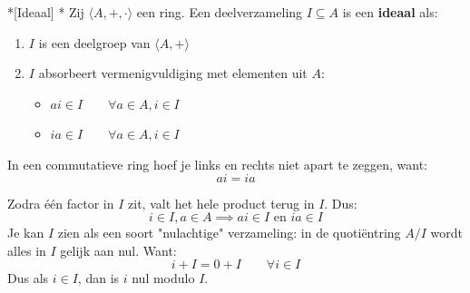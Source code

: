 
\begin{nicedefinition}*[Ideaal]
    \nextpart[]*
    Zij $\langle A, +, \cdot \rangle$ een ring. Een deelverzameling $I \subseteq A$ is een \textcolor{PineGreen!75!black}{\textbf{ideaal}} als:
    \begin{enumerate}
        \item $I$ is een deelgroep van $\langle A, + \rangle$
        \item $I$ absorbeert vermenigvuldiging met elementen uit $A$:
        \begin{itemize}
            \item[] $ai \in I \qquad \forall a \in A, i \in I$
            \item[] $ia \in I \qquad \forall a \in A, i \in I$
        \end{itemize}
    \end{enumerate}
\end{nicedefinition}

\textbf{} In een commutatieve ring hoef je links en rechts niet apart te zeggen, want:
\begin{equation*}
    ai = ia
\end{equation*}


Zodra één factor in $I$ zit, valt het hele product terug in $I$. Dus:
\begin{equation*}
    i \in I, a \in A \implies ai \in I \text{ en } ia \in I
\end{equation*}
Je kan $I$ zien als een soort "nulachtige" verzameling: in de quotiëntring $A/I$ wordt alles in $I$ gelijk aan nul. Want:
\begin{equation*}
    i+I = 0+I \qquad \forall i \in I
\end{equation*}
Dus als $i \in I$, dan is $i$ nul modulo $I$.


